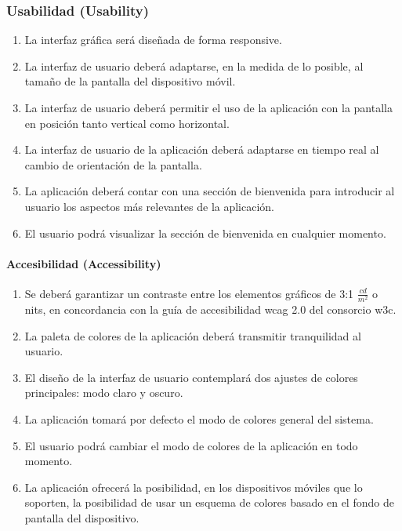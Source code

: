         \subsubsection{Usabilidad (Usability)}
            \begin{enumerate}[resume, label=\textbf{\texttt{RNF-\arabic*}}]
                \item La interfaz gráfica será diseñada de forma \gls{responsive}.
                \item La interfaz de usuario deberá adaptarse, en la medida de lo posible, al tamaño de la pantalla del dispositivo móvil.
                \item La interfaz de usuario deberá permitir el uso de la aplicación con la pantalla en posición tanto vertical como horizontal.
                \item La interfaz de usuario de la aplicación deberá adaptarse en tiempo real al cambio de orientación de la pantalla.
                \item La aplicación deberá contar con una sección de bienvenida para introducir al usuario los aspectos más relevantes de la aplicación.
                \item El usuario podrá visualizar la sección de bienvenida en cualquier momento.
            \end{enumerate}
            
            \paragraph{Accesibilidad (Accessibility)}
                \begin{enumerate}[resume, label=\textbf{\texttt{RNF-\arabic*}}]
                    \item Se deberá garantizar un contraste entre los elementos gráficos de 3:1 $\frac{cd}{m^{2}}$ o nits, en concordancia con la guía de accesibilidad \gls{wcag} 2.0 del consorcio \gls{w3c}\cite{w3c_web_2008}.
                    \item La paleta de colores de la aplicación deberá transmitir tranquilidad al usuario.
                    \item El diseño de la interfaz de usuario contemplará dos ajustes de colores principales: modo claro y oscuro.
                    \item La aplicación tomará por defecto el modo de colores general del sistema.
                    \item El usuario podrá cambiar el modo de colores de la aplicación en todo momento. 
                    \item La aplicación ofrecerá la posibilidad, en los dispositivos móviles que lo soporten, la posibilidad de usar un esquema de colores basado en el fondo de pantalla del dispositivo.
                \end{enumerate}
                
